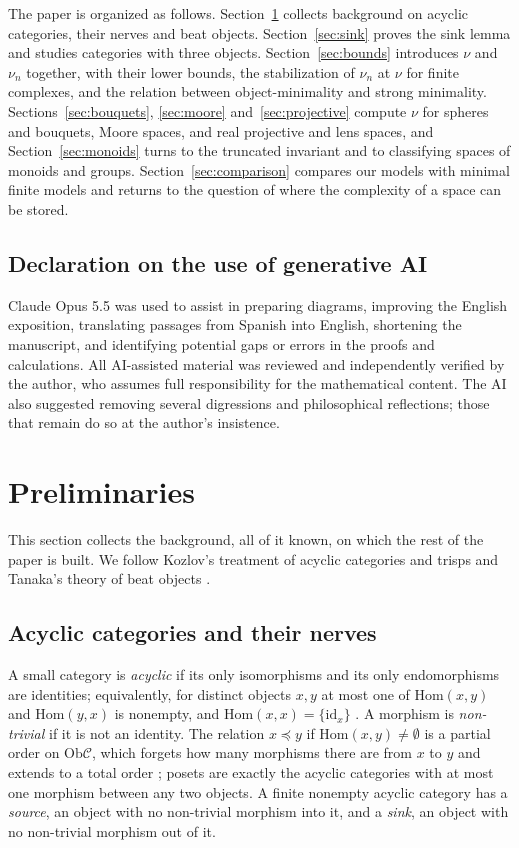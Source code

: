 \documentclass[12pt]{amsart}
\theoremstyle{definition}
\theoremstyle{remark}
\newcommand{\CC}{\mathcal{C}}
\newcommand{\id}{\mathrm{id}}
\newcommand{\Hom}{\mathrm{Hom}}
\newcommand{\Ob}{\mathrm{Ob}}
\begin{document}
The paper is organized as follows. Section~\ref{sec:prelim} collects background on acyclic categories, their nerves and beat objects. Section~\ref{sec:sink} proves the sink lemma and studies categories with three objects. Section~\ref{sec:bounds} introduces $\nu$ and $\nu_n$ together, with their lower bounds, the stabilization of $\nu_n$ at $\nu$ for finite complexes, and the relation between object-minimality and strong minimality. Sections~\ref{sec:bouquets}, \ref{sec:moore} and~\ref{sec:projective} compute $\nu$ for spheres and bouquets, Moore spaces, and real projective and lens spaces, and Section~\ref{sec:monoids} turns to the truncated invariant and to classifying spaces of monoids and groups. Section~\ref{sec:comparison} compares our models with minimal finite models and returns to the question of where the complexity of a space can be stored.

\subsection*{Declaration on the use of generative AI}
Claude Opus 5.5 was used to assist in preparing diagrams, improving the English exposition, translating passages from Spanish into English, shortening the manuscript, and identifying potential gaps or errors in the proofs and calculations. All AI-assisted material was reviewed and independently verified by the author, who assumes full responsibility for the mathematical content. The AI also suggested removing several digressions and philosophical reflections; those that remain do so at the author’s insistence.
\section{Preliminaries}\label{sec:prelim}

This section collects the background, all of it known, on which the rest of the paper is built. We follow Kozlov's treatment of acyclic categories and trisps \cite[Section~2.3 and Chapter~10]{Kozlov2008} and Tanaka's theory of beat objects \cite{Tanaka2019}.

\subsection{Acyclic categories and their nerves}\label{subsec:acyclic}\label{subsec:nerve}

A small category is \emph{acyclic} if its only isomorphisms and its only endomorphisms are identities; equivalently, for distinct objects $x,y$ at most one of $\Hom(x,y)$ and $\Hom(y,x)$ is nonempty, and $\Hom(x,x)=\{\id_x\}$ \cite[Section~10.1.1]{Kozlov2008}. A morphism is \emph{non-trivial} if it is not an identity. The relation $x\preceq y$ if $\Hom(x,y)\neq\emptyset$ is a partial order on $\Ob\CC$, which forgets how many morphisms there are from $x$ to $y$ and extends to a total order \cite[Section~10.1.2]{Kozlov2008}; posets are exactly the acyclic categories with at most one morphism between any two objects. A finite nonempty acyclic category has a \emph{source}, an object with no non-trivial morphism into it, and a \emph{sink}, an object with no non-trivial morphism out of it.
\end{document}
